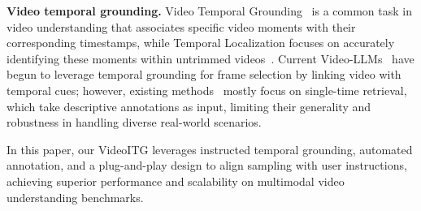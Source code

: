 
\noindent \textbf{Video temporal grounding.}
Video Temporal Grounding~\cite{ren2024timechat, wang2024grounded, qian2024momentor, di2024grounded} is a common task in video understanding that associates specific video moments with their corresponding timestamps, while Temporal Localization focuses on accurately identifying these moments within untrimmed videos~\cite{liu2024bench, anne2017localizing, li2024multi}. Current Video-LLMs~\cite{shen2024longvu, wang2024grounded, huang2024lita} have begun to leverage temporal grounding for frame selection by linking video with temporal cues; however, existing methods~\cite{huang2025frag,yu2023self,yu2025frame} mostly focus on single-time retrieval, which take descriptive annotations as input, limiting their generality and robustness in handling diverse real-world scenarios.


In this paper, our VideoITG leverages instructed temporal grounding, automated annotation, and a plug-and-play design to align sampling with user instructions, achieving superior performance and scalability on multimodal video understanding benchmarks.


